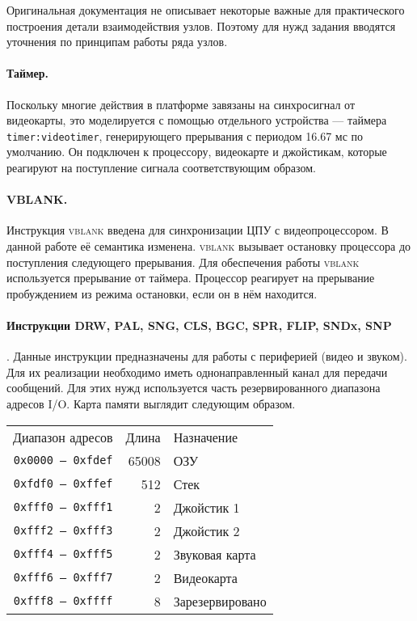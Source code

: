 Оригинальная документация не описывает некоторые важные для практического построения детали взаимодействия узлов. Поэтому для нужд задания вводятся уточнения по принципам работы ряда узлов.

\paragraph{Таймер.} Поскольку многие действия в платформе завязаны на синхросигнал от видеокарты, это моделируется с помощью отдельного устройства --- таймера \texttt{timer:videotimer}, генерирующего прерывания с периодом 16.67 мс по умолчанию. Он подключен к процессору, видеокарте и джойстикам, которые реагируют на поступление сигнала соответствующим образом.

\paragraph{VBLANK.} Инструкция \textsc{vblank} введена для синхронизации ЦПУ с видеопроцессором. В данной работе её семантика изменена. \textsc{vblank} вызывает остановку процессора до поступления следующего прерывания. Для обеспечения работы \textsc{vblank} используется прерывание от таймера. Процессор реагирует на прерывание пробуждением из режима остановки, если он в нём находится.

\paragraph{Инструкции DRW, PAL, SNG, CLS, BGC, SPR, FLIP, SNDx, SNP}. Данные инструкции предназначены для работы с периферией (видео и звуком). Для их реализации необходимо иметь однонаправленный канал для передачи сообщений. Для этих нужд используется  часть резервированного диапазона адресов I/O. Карта памяти выглядит следующим образом.

\begin{tabular}{rrl}
Диапазон адресов         & Длина & Назначение \\
\texttt{0x0000 -- 0xfdef}& 65008 & ОЗУ        \\
\texttt{0xfdf0 -- 0xffef}& 512   & Стек       \\
\texttt{0xfff0 -- 0xfff1}& 2     & Джойстик 1 \\
\texttt{0xfff2 -- 0xfff3}& 2     & Джойстик 2 \\
\texttt{0xfff4 -- 0xfff5}& 2     & Звуковая карта \\
\texttt{0xfff6 -- 0xfff7}& 2     & Видеокарта \\
\texttt{0xfff8 -- 0xffff}& 8     & Зарезервировано \\
\end{tabular}

